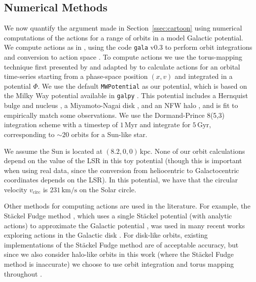 \documentclass[twocolumn]{aastex62}
\newcommand{\kpc}{\text{kpc}}
\newcommand{\Myr}{\text{Myr}}
\newcommand{\Gyr}{\text{Gyr}}
\newcommand{\kms}{\text{km}/\text{s}}
\begin{document}
\subsection{Numerical Methods} \label{ssec:action_comp}
We now quantify the argument made in Section~\ref{ssec:cartoon} using
numerical computations of the actions for a range of orbits in a model
Galactic potential. We compute actions as in
\citet{2018ApJ...867...31B}, using the code \texttt{gala} v0.3 to perform
orbit integrations and conversion to action space
\citep{2017JOSS....2..388P,Price-Whelan:2018}. To compute actions we use the
torus-mapping technique first presented by \citet{1990MNRAS.244..634M} and
adapted by \citet{2014MNRAS.441.3284S} to calculate actions for an orbital
time-series starting from a phase-space position $(x, v)$ and integrated in a
potential $\Phi$. We use the default \texttt{MWPotential} as our potential,
which is based on the Milky Way potential available in \texttt{galpy}
\citep{2015ApJS..216...29B}. This potential includes a Hernquist bulge and
nucleus \citep{1990ApJ...356..359H}, a Miyamoto-Nagai disk
\citep{1975PASJ...27..533M}, and an NFW halo \citep{1997ApJ...490..493N}, and
is fit to empirically match some observations. We use the Dormand-Prince
8(5,3) integration scheme \citep{Dormand80:integrator} with a timestep of
$1\,\Myr$ and integrate for $5\,\Gyr$, corresponding to $\sim 20$ orbits for a
Sun-like star.

We assume the Sun is located at $(8.2, 0, 0)\,\kpc$. None of our orbit
calculations depend on the value of the LSR in this toy potential (though this
is important when using real data, since the conversion from heliocentric to
Galactocentric coordinates depends on the LSR). In this potential, we have
that the circular velocity $v_{\text{circ}}$ is $231\,\kms$ on the Solar
circle.

Other methods for computing actions are used in the literature. For example,
the St\"ackel Fudge method \citep{2016MNRAS.457.2107S}, which uses a single
St\"ackel potential (with analytic actions) to approximate the Galactic
potential \citep{1985MNRAS.216..273D,2012MNRAS.426.1324B}, was used in many
recent works exploring actions in the Galactic disk
\citep[e.g.][]{2019MNRAS.484.3291T,2018MNRAS.481.4093S,2018arXiv180803278T}.
For disk-like orbits, existing implementations of the St\"ackel Fudge method
are of acceptable accuracy, but since we also consider halo-like orbits in
this work (where the St\"ackel Fudge method is inaccurate) we choose to use
orbit integration and torus mapping throughout \citep{2016MNRAS.457.2107S}.
\end{document}
